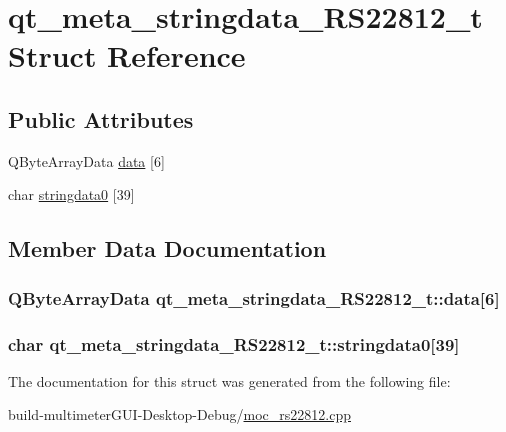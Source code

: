 \hypertarget{structqt__meta__stringdata___r_s22812__t}{\section{qt\-\_\-meta\-\_\-stringdata\-\_\-\-R\-S22812\-\_\-t Struct Reference}
\label{structqt__meta__stringdata___r_s22812__t}
}
\subsection*{Public Attributes}
\begin{DoxyCompactItemize}
\item 
Q\-Byte\-Array\-Data \hyperlink{structqt__meta__stringdata___r_s22812__t_a52ae1bf14bfccfd9cd345ca9301ff56b}{data} \mbox{[}6\mbox{]}
\item 
char \hyperlink{structqt__meta__stringdata___r_s22812__t_a50b2165bc2352a40d7b32f5e0caa7db6}{stringdata0} \mbox{[}39\mbox{]}
\end{DoxyCompactItemize}


\subsection{Member Data Documentation}
\hypertarget{structqt__meta__stringdata___r_s22812__t_a52ae1bf14bfccfd9cd345ca9301ff56b}{
\subsubsection[{data}]{\setlength{\rightskip}{0pt plus 5cm}Q\-Byte\-Array\-Data qt\-\_\-meta\-\_\-stringdata\-\_\-\-R\-S22812\-\_\-t\-::data\mbox{[}6\mbox{]}}}\label{structqt__meta__stringdata___r_s22812__t_a52ae1bf14bfccfd9cd345ca9301ff56b}
\hypertarget{structqt__meta__stringdata___r_s22812__t_a50b2165bc2352a40d7b32f5e0caa7db6}{
\subsubsection[{stringdata0}]{\setlength{\rightskip}{0pt plus 5cm}char qt\-\_\-meta\-\_\-stringdata\-\_\-\-R\-S22812\-\_\-t\-::stringdata0\mbox{[}39\mbox{]}}}\label{structqt__meta__stringdata___r_s22812__t_a50b2165bc2352a40d7b32f5e0caa7db6}


The documentation for this struct was generated from the following file\-:\begin{DoxyCompactItemize}
\item 
build-\/multimeter\-G\-U\-I-\/\-Desktop-\/\-Debug/\hyperlink{moc__rs22812_8cpp}{moc\-\_\-rs22812.\-cpp}\end{DoxyCompactItemize}
